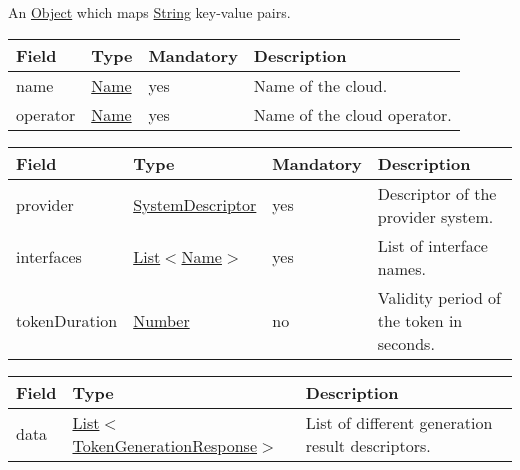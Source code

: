 \documentclass[a4paper]{arrowhead}
\newcommand{\pref}[1]{{\textcolor{ArrowheadGrey}{\hyperref[sec:model:primitives:#1]{#1}}}}
\begin{document}
\label{sec:model:Metadata}

An \pref{Object} which maps \pref{String} key-value pairs.

\label{sec:model:CloudDescriptor}

\begin{table}[ht!]
\begin{tabularx}{\textwidth}{| p{3cm} | p{3cm} | p{2cm} | X |} \hline
\rowcolor{gray!33} Field & Type & Mandatory & Description \\ \hline
name & \pref{Name} & yes & Name of the cloud. \\ \hline
operator & \pref{Name} & yes & Name of the cloud operator. \\ \hline
\end{tabularx}
\end{table}

\clearpage

\label{sec:model:TokenGenerationDescriptor}

\begin{table}[ht!]
\begin{tabularx}{\textwidth}{| p{3cm} | p{6cm} | p{2cm} | X |} \hline
\rowcolor{gray!33} Field & Type & Mandatory & Description \\ \hline
provider & \hyperref[sec:model:SystemDescriptor]{SystemDescriptor} & yes & Descriptor of the provider system. \\ \hline
interfaces & \pref{List}$<$\pref{Name}$>$ & yes & List of interface names. \\ \hline
tokenDuration &  \pref{Number} & no & Validity period of the token in se\-conds. \\ \hline
\end{tabularx}
\end{table}

\label{sec:model:TokenGenerationMultiResponse}
 
\begin{table}[ht!]
\begin{tabularx}{\textwidth}{| p{2cm} | p{5.5cm} | X |} \hline
\rowcolor{gray!33} Field & Type      & Description \\ \hline
data & \pref{List}$<$\hyperref[sec:model:TokenGenerationResponse]{TokenGenerationResponse}$>$ & List of different generation result descriptors. \\ \hline
\end{tabularx}
\end{table}
\end{document}
